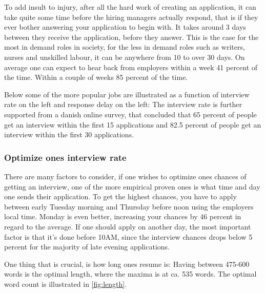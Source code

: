 To add insult to injury, after all the hard work of creating an application, it can
take quite some time before the hiring managers actually respond, that is if they ever
bother answering your application to begin with.
It takes around 3 days between they receive the application, before they answer.
This is the case for the most in demand roles in society, for the less in demand roles
such as writers, nurses and unskilled labour, it can be anywhere from 10 to over 30 days.
On average one can expect to hear back from employers within a week 41 percent
of the time. Within a couple of weeks 85 percent of the time.

Below some of the more popular jobs are illustrated as a function of interview
rate on the left and response delay on the left:
The interview rate is further supported from a danish online survey, that concluded
that 65 percent of people get an interview within the first 15 applications and
82.5 percent of people get an interview within the first 30 applications.

\subsubsection{Optimize ones interview rate}
There are many factors to consider, if one wishes to optimize ones
chances of getting an interview, one of the more empirical proven ones
is what time and day one sends their application.
To get the highest chances, you have to apply between early Tuesday morning
and Thursday before noon using the employers local time. Monday is even better,
increasing your chances by 46 percent in regard to the average.
If one should apply on another day, the most important factor is that
it's done before 10AM, since the interview chances drops below 5 percent for
the majority of late evening applications.

One thing that is crucial, is how long ones resume is:
Having between 475-600 words is the optimal length, where the maxima is at
ca. 535 words. The optimal word count is illustrated in \vref{fig:length}.

